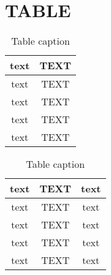 \section*{TABLE}


\begin {table}[h]
    \begin{center}
    \caption {Table caption} 
    \label{tab:title} 
    \begin{tabular}{|c|c|}\hline 
    \rowcolor{cadetgrey}
    \textbf{text}   & \textbf{TEXT} \\ \hline 
    text    &   TEXT        \\ \rowcolor{gainsboro}
    text    &   TEXT        \\
    text    &   TEXT        \\ \rowcolor{gainsboro}
    text    &   TEXT        \\
    \hline
    \end{tabular}
    \end{center}
\end{table}


\begin {table}[h]
    \begin{center}
    \caption {Table caption} 
    \label{tab:title} 
    \begin{tabular}{|c|c|c|}\hline 
    \rowcolor{cadetgrey}
    \textbf{text}   & \textbf{TEXT}    &    \textbf{text} \\ \hline 
    text    &   TEXT    &   text        \\ \rowcolor{gainsboro}
    text    &   TEXT    &   text        \\ 
    text    &   TEXT    &   text        \\ \rowcolor{gainsboro}
    text    &   TEXT    &   text        \\
    \hline
    \end{tabular}
    \end{center}
\end{table}

